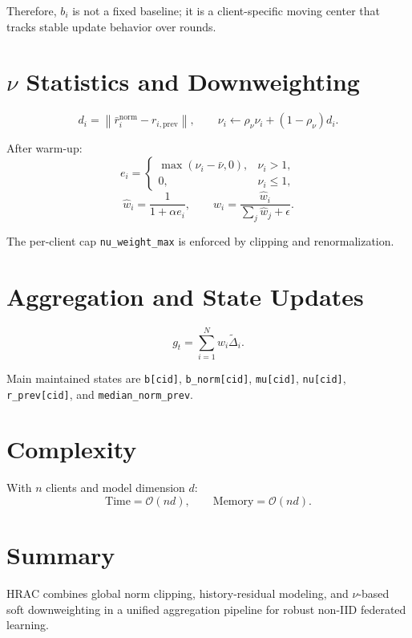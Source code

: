 \documentclass[12pt]{report}
\begin{document}
Therefore, $b_i$ is not a fixed baseline; it is a client-specific moving center that tracks stable update behavior over rounds.

\section{$\nu$ Statistics and Downweighting}

\begin{equation}
d_i=\left\|\bar{r}_i^{\mathrm{norm}}-r_{i,\mathrm{prev}}\right\|, \qquad
\nu_i \leftarrow \rho_\nu \nu_i + (1-\rho_\nu)d_i.
\end{equation}

After warm-up:
\begin{equation}
e_i=
\begin{cases}
\max(\nu_i-\bar{\nu},0), & \nu_i>1,\\
0, & \nu_i \le 1,
\end{cases}
\end{equation}
\begin{equation}
\hat{w}_i=\frac{1}{1+\alpha e_i}, \qquad
w_i=\frac{\hat{w}_i}{\sum_j \hat{w}_j+\epsilon}.
\end{equation}

The per-client cap \texttt{nu\_weight\_max} is enforced by clipping and renormalization.

\section{Aggregation and State Updates}

\begin{equation}
g_t=\sum_{i=1}^{N}w_i\tilde{\Delta}_i.
\end{equation}

Main maintained states are \texttt{b[cid]}, \texttt{b\_norm[cid]}, \texttt{mu[cid]}, \texttt{nu[cid]}, \texttt{r\_prev[cid]}, and \texttt{median\_norm\_prev}.

\section{Complexity}

With $n$ clients and model dimension $d$:
\begin{equation}
\text{Time}=\mathcal{O}(nd), \qquad \text{Memory}=\mathcal{O}(nd).
\end{equation}

\section{Summary}

HRAC combines global norm clipping, history-residual modeling, and $\nu$-based soft downweighting in a unified aggregation pipeline for robust non-IID federated learning.
\end{document}
